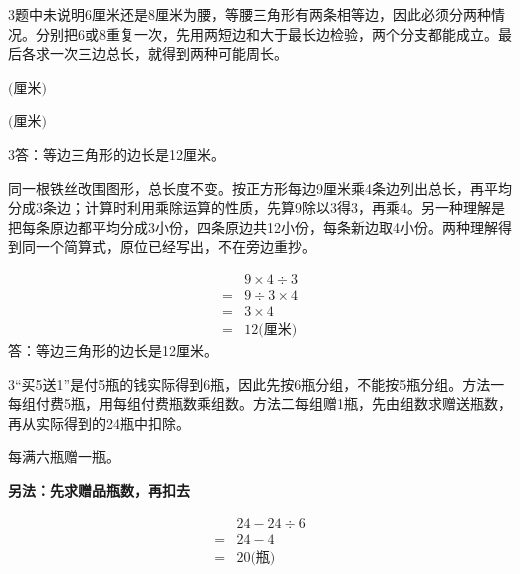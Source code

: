 \documentclass[multi=snippet,border={5bp 20bp 5bp 5bp}]{standalone}
\newenvironment{snippet}[3]{\begin{minipage}{#1bp}\color{answerred}\fontsize{#2}{#3}\selectfont\raggedright}{\end{minipage}}
\begin{document}
\begin{snippet}{505}{11.5}{14}\begin{multicols}{3}\raggedcolumns 题中未说明6厘米还是8厘米为腰，等腰三角形有两条相等边，因此必须分两种情况。分别把6或8重复一次，先用两短边和大于最长边检验，两个分支都能成立。最后各求一次三边总长，就得到两种可能周长。\end{multicols}\end{snippet}
\begin{snippet}{80}{9.5}{14}\SourceSans\setlength{\mathindent}{2bp}\(\text{(厘米)}\)\end{snippet}
\begin{snippet}{80}{9.5}{14}\SourceSans\setlength{\mathindent}{2bp}\(\text{(厘米)}\)\end{snippet}
\begin{snippet}{505}{11.5}{14}\begin{multicols}{3}\raggedcolumns 答：等边三角形的边长是12厘米。\par 同一根铁丝改围图形，总长度不变。按正方形每边9厘米乘4条边列出总长，再平均分成3条边；计算时利用乘除运算的性质，先算9除以3得3，再乘4。另一种理解是把每条原边都平均分成3小份，四条原边共12小份，每条新边取4小份。两种理解得到同一个简算式，原位已经写出，不在旁边重抄。\end{multicols}\end{snippet}
\begin{snippet}{359}{10.5}{12.8}\SourceSans\setlength{\mathindent}{2bp}\[\begin{aligned}&9\times4\div3\\={}&9\div3\times4\\={}&3\times4\\={}&12\text{(厘米)}\end{aligned}\]答：等边三角形的边长是12厘米。\end{snippet}
\begin{snippet}{505}{11.5}{14}\begin{multicols}{3}\raggedcolumns “买5送1”是付5瓶的钱实际得到6瓶，因此先按6瓶分组，不能按5瓶分组。方法一每组付费5瓶，用每组付费瓶数乘组数。方法二每组赠1瓶，先由组数求赠送瓶数，再从实际得到的24瓶中扣除。\par 每满六瓶赠一瓶。\par \textbf{另法：先求赠品瓶数，再扣去}\par \[\begin{aligned}&24-24\div6\\={}&24-4\\={}&20\text{(瓶)}\end{aligned}\]\end{multicols}\end{snippet}
\end{document}
